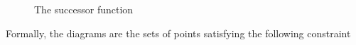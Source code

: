 \begin{figure}
\caption{The successor function}
\label{fig:successor}
\end{figure}

Formally, the diagrams are the sets of points satisfying the following constraint

